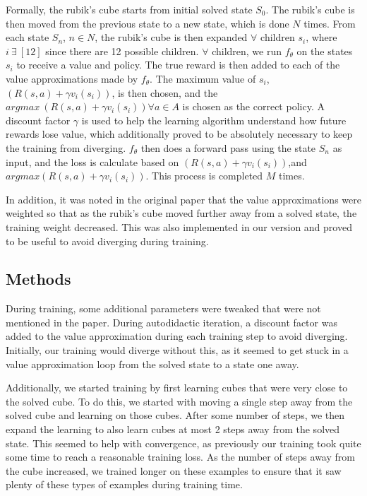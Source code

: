 \documentclass[10pt,twocolumn,letterpaper]{article}
\begin{document}
Formally, the rubik's cube starts from initial solved state $S_0$. The rubik's cube is then moved from the previous state to a new state, which is done $N$ times. From each state $S_n$, $n \in N$, the rubik's cube is then expanded $\forall$ children $s_i$, where $i \ \exists \ [12]$ since there are 12 possible children. $\forall$ children, we run $f_\theta$ on the states $s_i$ to receive a value and policy. The true reward is then added to each of the value approximations made by $f_\theta$. 
The maximum value of $s_i$, $(R(s, a) + \gamma v_i(s_i))$,  is then chosen, and the $argmax \ (R(s, a) + \gamma v_i(s_i)) \forall a \in A$ is chosen as the correct policy. A discount factor $\gamma$ is used to help the learning algorithm understand how future rewards lose value, which additionally proved to be absolutely necessary to keep the training from diverging. $f_\theta$ then does a forward pass using the state $S_n$ as input, and the loss is calculate based on $(R(s, a) + \gamma v_i(s_i))$,and $argmax (R(s, a) + \gamma v_i(s_i))$. This process is completed $M$ times.

In addition, it was noted in the original paper that the value approximations were weighted so that as the rubik's cube moved further away from a solved state, the training weight decreased. This was also implemented in our version and proved to be useful to avoid diverging during training.


\subsection{Methods}
During training, some additional parameters were tweaked that were not mentioned in the paper. During autodidactic iteration, a discount factor was added to the value approximation during each training step to avoid diverging. Initially, our training would diverge without this, as it seemed to get stuck in a value approximation loop from the solved state to a state one away.

Additionally, we started training by first learning cubes that were very close to the solved cube. To do this, we started with moving a single step away from the solved cube and learning on those cubes. After some number of steps, we then expand the learning to also learn cubes at most 2 steps away from the solved state. This seemed to help with convergence, as previously our training took quite some time to reach a reasonable training loss. As the number of steps away from the cube increased, we trained longer on these examples to ensure that it saw plenty of these types of examples during training time. 
\end{document}
